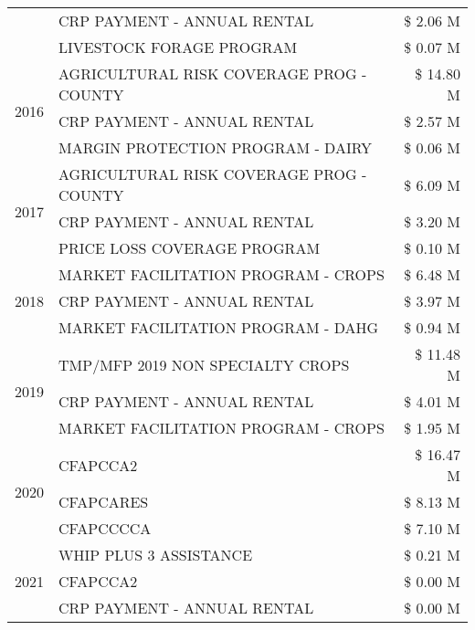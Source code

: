 \begin{tabular}{llr}
 & CRP PAYMENT - ANNUAL RENTAL & \$ 2.06 M \\
 & LIVESTOCK FORAGE PROGRAM & \$ 0.07 M \\
\cline{1-3}
\multirow[t]{3}{*}{2016} & AGRICULTURAL RISK COVERAGE PROG - COUNTY & \$ 14.80 M \\
 & CRP PAYMENT - ANNUAL RENTAL & \$ 2.57 M \\
 & MARGIN PROTECTION PROGRAM - DAIRY & \$ 0.06 M \\
\cline{1-3}
\multirow[t]{3}{*}{2017} & AGRICULTURAL RISK COVERAGE PROG - COUNTY & \$ 6.09 M \\
 & CRP PAYMENT - ANNUAL RENTAL & \$ 3.20 M \\
 & PRICE LOSS COVERAGE PROGRAM & \$ 0.10 M \\
\cline{1-3}
\multirow[t]{3}{*}{2018} & MARKET FACILITATION PROGRAM - CROPS & \$ 6.48 M \\
 & CRP PAYMENT - ANNUAL RENTAL & \$ 3.97 M \\
 & MARKET FACILITATION PROGRAM - DAHG & \$ 0.94 M \\
\cline{1-3}
\multirow[t]{3}{*}{2019} & TMP/MFP 2019 NON SPECIALTY CROPS & \$ 11.48 M \\
 & CRP PAYMENT - ANNUAL RENTAL & \$ 4.01 M \\
 & MARKET FACILITATION PROGRAM - CROPS & \$ 1.95 M \\
\cline{1-3}
\multirow[t]{3}{*}{2020} & CFAPCCA2 & \$ 16.47 M \\
 & CFAPCARES & \$ 8.13 M \\
 & CFAPCCCCA & \$ 7.10 M \\
\cline{1-3}
\multirow[t]{3}{*}{2021} & WHIP PLUS 3 ASSISTANCE & \$ 0.21 M \\
 & CFAPCCA2 & \$ 0.00 M \\
 & CRP PAYMENT - ANNUAL RENTAL & \$ 0.00 M \\
\cline{1-3}
\bottomrule
\end{tabular}
